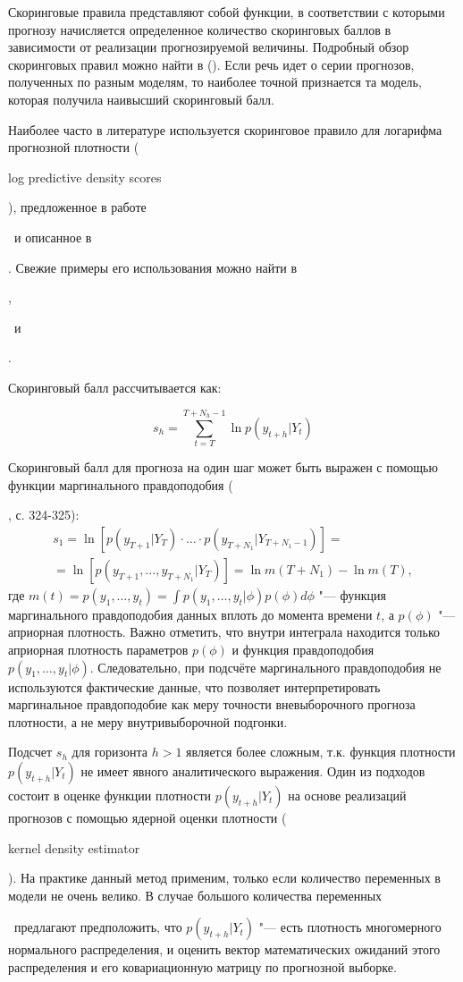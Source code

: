 \documentclass[11pt]{article} %
\newcommand{\eng}[1]{\begin{otherlanguage}{english}#1\end{otherlanguage}}
\begin{document}
Скоринговые правила представляют собой функции, в соответствии с которыми прогнозу начисляется определенное количество скоринговых баллов в зависимости от реализации прогнозируемой величины. Подробный обзор скоринговых правил можно найти в (\cite{tsyplakov_2012}). Если речь идет о серии прогнозов, полученных по разным моделям, то наиболее точной признается та модель, которая получила наивысший скоринговый балл.

Наиболее часто в литературе используется скоринговое правило для логарифма прогнозной плотности (\eng{log predictive density scores}), предложенное в работе \eng{\cite{good_1952}}~и описанное в \eng{\cite{geweke_amisano_2010}}. Свежие примеры его использования можно найти в \eng{\cite{adolfson_al_2007}}, \eng{\cite{christoffel_al_2010}}~и \eng{\cite{carriero_al_2015}}.

Скоринговый балл рассчитывается как:

\begin{equation}
s_h=\sum_{t=T}^{T+N_h-1} \ln p(y_{t+h}|Y_t)
\end{equation}


Скоринговый балл для прогноза на один шаг может быть выражен с помощью функции маргинального правдоподобия (\eng{\cite{adolfson_al_2007}}, с. 324-325):
\begin{multline}
s_1 =\ln [p(y_{T+1}|Y_T)\cdot \ldots \cdot p(y_{T+N_1}|Y_{T+N_1-1})]= \\
=\ln[p(y_{T+1},\ldots,y_{T+N_1}|Y_T)]=\ln m(T+N_1)-\ln m(T),
\end{multline}
где $m(t)=p(y_1,\ldots,y_t)=\int p(y_1,\ldots,y_t|\phi) p(\phi) d\phi$ "--- функция маргинального правдоподобия данных вплоть до момента времени $t$, а $p(\phi)$ "--- априорная плотность. Важно отметить, что внутри интеграла находится только априорная плотность параметров $p(\phi)$ и функция правдоподобия $p(y_1, \ldots, y_t | \phi)$. Следовательно, при подсчёте маргинального правдоподобия не используются фактические данные,  что позволяет интерпретировать маргинальное правдоподобие как меру точности вневыборочного прогноза плотности, а не меру внутривыборочной подгонки.

Подсчет $s_h$ для горизонта $h>1$ является более сложным, т.к. функция плотности $p(y_{t+h}|Y_t)$ не имеет явного аналитического выражения. Один из подходов состоит в оценке функции плотности $p(y_{t+h}|Y_t)$ на основе реализаций прогнозов с помощью ядерной оценки плотности (\eng{kernel density estimator}). На практике данный метод применим, только если количество переменных в модели не очень велико. В случае большого количества переменных  \eng{\cite{adolfson_al_2007}}~предлагают предположить, что $p(y_{t+h}|Y_t)$ "--- есть плотность многомерного нормального распределения, и оценить вектор математических ожиданий этого распределения и его ковариационную матрицу по прогнозной выборке.
\end{document}
